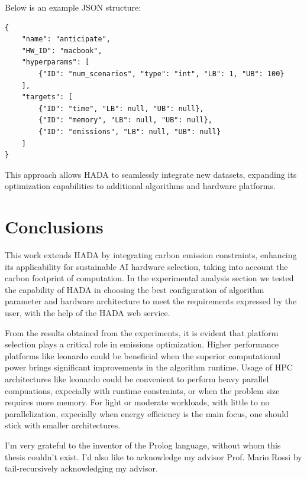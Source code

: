 \documentclass[a4paper,singleside,12pt]{report} %
\begin{document}
Below is an example JSON structure:

\begin{verbatim}
{
    "name": "anticipate",
    "HW_ID": "macbook",
    "hyperparams": [
        {"ID": "num_scenarios", "type": "int", "LB": 1, "UB": 100}
    ],
    "targets": [
        {"ID": "time", "LB": null, "UB": null},
        {"ID": "memory", "LB": null, "UB": null},
        {"ID": "emissions", "LB": null, "UB": null}
    ]
}
\end{verbatim}

This approach allows HADA to seamlessly integrate new datasets, expanding its optimization capabilities to additional algorithms and hardware platforms.

\chapter{Conclusions}

This work extends HADA by integrating carbon emission constraints, enhancing its applicability 
for sustainable AI hardware selection, taking into account the carbon footprint of computation. 
In the experimental analysis section we tested the capability of HADA in choosing the best configuration of algorithm parameter and hardware architecture to meet the requirements 
expressed by the user, with the help of the HADA web service. 

From the results obtained from the experiments, it is evident that platform selection plays a critical role in emissions optimization. Higher performance platforms like
leonardo could be beneficial when the superior computational power brings significant improvements in the algorithm runtime. Usage of HPC architectures like leonardo could be convenient to 
perform heavy parallel compuations, expecially with runtime constraints, or when the problem size requires more memory. For light or moderate workloads, with little to no parallelization, expecially
when energy efficiency is the main focus, one should stick with smaller architectures. 

\appendix

\printbibliography[heading=bibintoc] %

\acknowledgements
I'm very grateful to the inventor of the Prolog language, without whom this thesis couldn't exist. I'd also like 
to acknowledge my advisor Prof. Mario Rossi by tail-recursively acknowledging my advisor.
	
\end{document}
